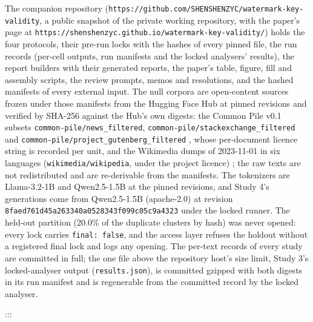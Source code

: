 \documentclass[11pt,letterpaper]{article}
\begin{document}
The companion repository (\texttt{https:/\allowbreak{}/\allowbreak{}github.\allowbreak{}com/\allowbreak{}SHENSHENZYC/\allowbreak{}watermark-\allowbreak{}key-\allowbreak{}validity}, a public snapshot of the private working repository, with the paper's page at \texttt{https:/\allowbreak{}/\allowbreak{}shenshenzyc.\allowbreak{}github.\allowbreak{}io/\allowbreak{}watermark-\allowbreak{}key-\allowbreak{}validity/\allowbreak{}}) holds the four protocols, their pre-run locks with the hashes of every pinned file, the run records (per-cell outputs, run manifests and the locked analysers' results), the report builders with their generated reports, the paper's table, figure, fill and assembly scripts, the review prompts, memos and resolutions, and the hashed manifests of every external input. The null corpora are open-content sources frozen under those manifests from the Hugging Face Hub at pinned revisions and verified by SHA-256 against the Hub's own digests: the Common Pile v0.1 subsets \texttt{common-\allowbreak{}pile/\allowbreak{}news\_\allowbreak{}filtered}, \texttt{common-\allowbreak{}pile/\allowbreak{}stackexchange\_\allowbreak{}filtered} and \texttt{common-\allowbreak{}pile/\allowbreak{}project\_\allowbreak{}gutenberg\_\allowbreak{}filtered} \citep{kandpal2025commonpile}, whose per-document licence string is recorded per unit, and the Wikimedia dumps of 2023-11-01 in six languages (\texttt{wikimedia/\allowbreak{}wikipedia}, under the project licence) \citep{wikimedia2023dump}; the raw texts are not redistributed and are re-derivable from the manifests. The tokenizers are Llama-3.2-1B and Qwen2.5-1.5B at the pinned revisions, and Study 4's generations come from Qwen2.5-1.5B (apache-2.0) at revision \texttt{8fae\allowbreak{}d761\allowbreak{}d45a\allowbreak{}2633\allowbreak{}40a0\allowbreak{}5283\allowbreak{}43f0\allowbreak{}99c0\allowbreak{}5c9a\allowbreak{}4323} under the locked runner. The held-out partition (20.0\% of the duplicate clusters by hash) was never opened: every lock carries \texttt{final:\ false}, and the access layer refuses the holdout without a registered final lock and logs any opening. The per-text records of every study are committed in full; the one file above the repository host's size limit, Study 3's locked-analyser output (\texttt{results.\allowbreak{}json}), is committed gzipped with both digests in its run manifest and is regenerable from the committed record by the locked analyser.




:::
\end{document}
